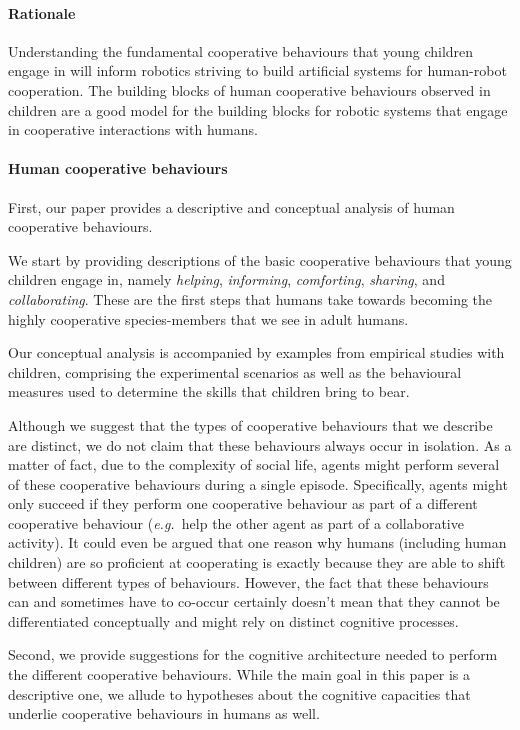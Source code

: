 \documentclass{article}
\newcommand{\eg}{{\textit{e.g.~}}}
\begin{document}
\paragraph{Rationale} Understanding the fundamental cooperative behaviours that young
children engage in will inform robotics striving to build artificial systems
for human-robot cooperation. The building blocks of human cooperative behaviours
observed in children are a good model for the building blocks for robotic
systems that engage in cooperative interactions with humans.

\paragraph{Human cooperative behaviours} First, our paper provides a
descriptive and conceptual analysis of human cooperative behaviours.

We start by providing descriptions of the basic cooperative behaviours that young
children engage in, namely \emph{helping}, \emph{informing}, \emph{comforting},
\emph{sharing}, and \emph{collaborating}. These are the first steps that humans
take towards becoming the highly cooperative species-members that we see in
adult humans.

Our conceptual analysis is accompanied by examples from empirical studies with
children, comprising the experimental scenarios as well as the behavioural
measures used to determine the skills that children bring to bear.

Although we suggest that the types of cooperative behaviours that we
describe are distinct, we do not claim that these behaviours always occur in
isolation. As a matter of fact, due to the complexity of social life,
agents might perform several of these cooperative behaviours during a
single episode. Specifically, agents might only succeed if they perform one
cooperative behaviour as part of a different cooperative behaviour (\eg help
the other agent as part of a collaborative activity). It could even be
argued that one reason why humans (including human children) are so
proficient at cooperating is exactly because they are able to shift between
different types of behaviours. However, the fact that these behaviours can
and sometimes have to co-occur certainly doesn't mean that they cannot be
differentiated conceptually and might rely on distinct cognitive processes.

Second, we provide suggestions for the cognitive architecture needed to perform
the different cooperative behaviours. While the main goal in this paper is a
descriptive one, we allude to hypotheses about the cognitive capacities that
underlie cooperative behaviours in humans as well. 
\end{document}
